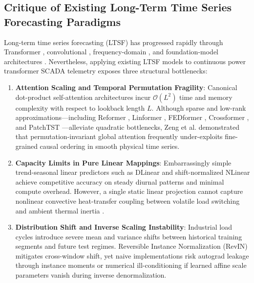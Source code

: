\documentclass[pdflatex,sn-mathphys-num,referee,lineno]{sn-jnl}
\theoremstyle{thmstyleone}
\theoremstyle{thmstyletwo}
\theoremstyle{thmstylethree}
\begin{document}
\subsection{Critique of Existing Long-Term Time Series Forecasting Paradigms}\label{subsec:critique_ltsf}
Long-term time series forecasting (LTSF) has progressed rapidly through Transformer \cite{vaswani2017attention, tay2022efficienttrans}, convolutional \cite{luo2024moderntcn, fan2025gcinet}, frequency-domain \cite{wu2023timesnet, yang2024fedaf}, and foundation-model architectures \cite{jin2024timellm}. Nevertheless, applying existing LTSF models to continuous power transformer SCADA telemetry exposes three structural bottlenecks:
\begin{enumerate}
    \item \textbf{Attention Scaling and Temporal Permutation Fragility}: Canonical dot-product self-attention architectures \cite{zhou2021informer, wu2021autoformer} incur $\mathcal{O}(L^2)$ time and memory complexity with respect to lookback length $L$. Although sparse and low-rank approximations---including Reformer \cite{kitaev2020reformer}, Linformer \cite{wang2020linformer}, FEDformer \cite{zhou2022fedformer}, Crossformer \cite{zhang2023crossformer}, and PatchTST \cite{nie2023patchtst}---alleviate quadratic bottlenecks, Zeng et al. \cite{zeng2023dlinear} demonstrated that permutation-invariant global attention frequently under-exploits fine-grained causal ordering in smooth physical time series.
    \item \textbf{Capacity Limits in Pure Linear Mappings}: Embarrassingly simple trend-seasonal linear predictors such as DLinear and shift-normalized NLinear \cite{zeng2023dlinear} achieve competitive accuracy on steady diurnal patterns and minimal compute overhead. However, a single static linear projection cannot capture nonlinear convective heat-transfer coupling between volatile load switching and ambient thermal inertia \cite{susa2005dynamic, gouda2012topoil}.
    \item \textbf{Distribution Shift and Inverse Scaling Instability}: Industrial load cycles introduce severe mean and variance shifts between historical training segments and future test regimes. Reversible Instance Normalization (RevIN) \cite{kim2022revin} mitigates cross-window shift, yet naive implementations risk autograd leakage through instance moments or numerical ill-conditioning if learned affine scale parameters vanish during inverse denormalization.
\end{enumerate}
\end{document}

